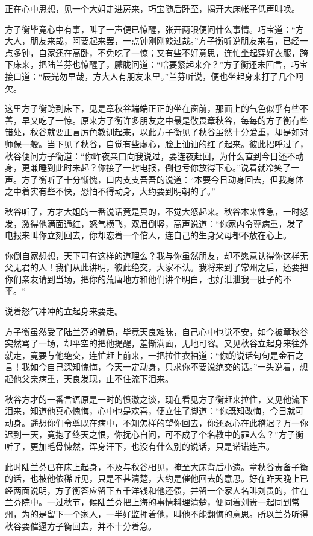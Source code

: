 \documentclass[12pt,UTF8]{ctexbook}
\begin{document}
{{{正在心中思想，见一个大姐走进房来，巧宝随后踵至，揭开大床帐子低声叫唤。

方子衡毕竟心中有事，叫了一声便已惊醒，张开两眼便问什么事情。巧宝道：“方大人，朋友来哉，阿要起来罢，一点钟刚刚敲过哉。”方子衡听说朋友来看，已经一点多钟，自家还在高卧，不免吃了一惊；又有些不好意思，连忙坐起穿好衣服，跨下床来，把陆兰芬也惊醒了，朦胧问道：“啥要紧起来介？”方子衡还未回言，巧宝接口道：“辰光勿早哉，方大人有朋友来里。”兰芬听说，便也坐起身来打了几个呵欠。

这里方子衡跨到床下，见是章秋谷端端正正的坐在窗前，那面上的气色似乎有些不善，早又吃了一惊。原来方子衡许多朋友之中最是敬畏章秋谷，每每的方子衡有些错处，秋谷就要正言厉色教训起来，以此方子衡见了秋谷虽然十分爱重，却是如对师保一般。当下见了秋谷，自觉有些虚心，脸上讪讪的红了起来。彼此招呼过了，秋谷便问方子衡道：“你昨夜亲口向我说过，要连夜赶回，为什么直到今日还不动身，更兼睡到此时未起？你接了一封电报，倒也亏你放得下心。”说着就冷笑了一声。方子衡听了十分惭愧，口内支支吾吾的说道：“本要今日动身回去，但我身体之中着实有些不快，恐怕不得动身，大约要到明朝的了。”

秋谷听了，方才大姐的一番说话竟是真的，不觉大怒起来。秋谷本来性急，一时怒发，激得他满面通红，怒气横飞，双眉倒竖，高声说道：“你家内令尊病重，发了电报来叫你立刻回去，你却恋着一个倌人，连自己的生身父母都不放在心上。

你倒自家想想，天下可有这样的道理么？我与你虽然朋友，却不愿意认得你这样无父无君的人！我们从此讲明，彼此绝交，大家不认。我将来到了常州之后，还要把你们亲友请到当场，把你的荒唐地方和他们讲个明白，也好泄泄我一肚子的不平。“

说着怒气冲冲的立起身来要走。

方子衡虽然受了陆兰芬的骗局，毕竟天良难昧，自己心中也觉不安，如今被章秋谷突然骂了一场，却平空的把他提醒，羞惭满面，无地可容。又见秋谷立起身来往外就走，竟要与他绝交，连忙赶上前来，一把拉住衣袖道：“你的说话句句是金石之言！我如今自己深知愧悔，今天一定动身，只求你不要说绝交的话。”一头说着，想起他父亲病重，天良发现，止不住流下泪来。

秋谷方才的一番言语原是一时的愤激之谈，现在看见方子衡赶来拉住，又见他流下泪来，知道他真心愧悔，心中也是欢喜，便立住了脚道：“你既知改悔，今日就可动身。遥想你们令尊既在病中，不知怎样的望你回去，你还忍心在此稽迟？万一你迟到一天，竟抱了终天之恨，你抚心自问，可不成了个名教中的罪人么？”方子衡听了，更加毛骨悚然，浑身汗下，也没有什么别的说话，只是诺诺连声。

此时陆兰芬已在床上起身，不及与秋谷相见，掩至大床背后小遗。章秋谷责备子衡的话，也被他依稀听见，只是不甚清楚，大约是催他回去的意思。好在昨天晚上已经两面说明，方子衡答应留下五千洋钱和他还债，并留一个家人名叫刘贵的，住在兰芬院中。一过秋节，候陆兰芬把上海的事情料理清楚，便同着刘贵一起同到常州，为的是留下一个家人，一半好监押着他，叫他不能翻悔的意思。所以兰芬听得秋谷要催逼方子衡回去，并不十分着急。

}}}
\end{document}
